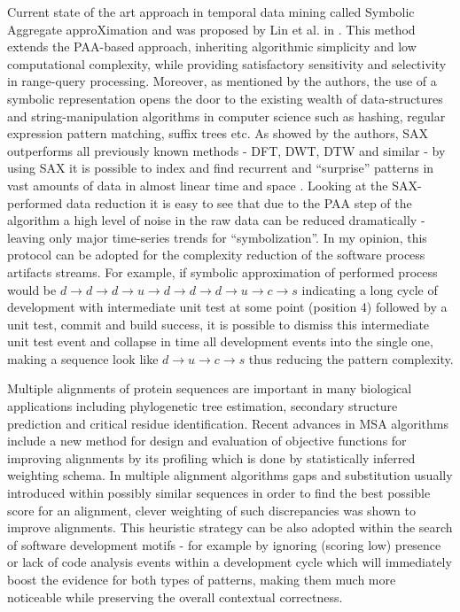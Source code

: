 \documentclass{sig-alternate}
\begin{document}
Current state of the art approach in temporal data mining called Symbolic Aggregate approXimation and was proposed by Lin et al. in \cite{citeulike:2821475}. This method extends the PAA-based approach, inheriting algorithmic simplicity and low computational complexity, while providing satisfactory sensitivity and selectivity in range-query processing. Moreover, as mentioned by the authors, the use of a symbolic representation opens the door to the existing wealth of data-structures and string-manipulation algorithms in computer science such as hashing, regular expression pattern matching, suffix trees etc. As showed by the authors, SAX outperforms all previously known methods - DFT, DWT, DTW and similar - by using SAX it is possible to index and find recurrent and ``surprise'' patterns in vast amounts of data in almost linear time and space \cite{citeulike:1630245} \cite{citeulike:3025877} \cite{citeulike:3000416}. Looking at the SAX-performed data reduction it is easy to see that due to the PAA step of the algorithm a high level of noise in the raw data can be reduced dramatically - leaving only major time-series trends for ``symbolization''. In my opinion, this protocol can be adopted for the complexity reduction of the software process artifacts streams. For example, if symbolic approximation of performed process would be $d \rightarrow d \rightarrow d \rightarrow u \rightarrow d \rightarrow d \rightarrow d \rightarrow u \rightarrow c \rightarrow s $ indicating a long cycle of development with intermediate unit test at some point (position 4) followed by a unit test, commit and build success, it is possible to dismiss this intermediate unit test event and collapse in time all development events into the single one, making a sequence look like  $d \rightarrow u \rightarrow c \rightarrow s $ thus reducing the pattern complexity. 

Multiple alignments of protein sequences are important in many biological applications including phylogenetic tree estimation, secondary structure prediction and critical residue identification. Recent advances in MSA algorithms \cite{citeulike:692} include a new method for design and evaluation of objective functions for improving alignments by its profiling which is done by statistically inferred weighting schema. In multiple alignment algorithms gaps and substitution usually introduced within possibly similar sequences in order to find the best possible score for an alignment, clever weighting of such discrepancies was shown to improve alignments. This heuristic strategy can be also adopted within the search of software development motifs - for example by ignoring (scoring low) presence or lack of code analysis events within a development cycle which will immediately boost the evidence for both types of patterns, making them much more noticeable while preserving the overall contextual correctness.
\end{document}
